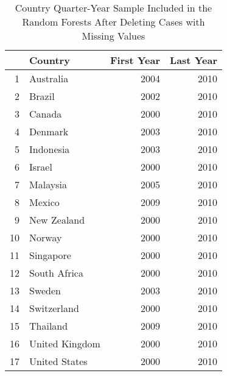\begin{table}[ht]
\centering
\caption{Country Quarter-Year Sample Included in the Random Forests After Deleting Cases with Missing Values} 
\begingroup\tiny
\begin{tabular}{rlrr}
  \hline
 & Country & First Year & Last Year \\ 
  \hline
1 & Australia & 2004 & 2010 \\ 
  2 & Brazil & 2002 & 2010 \\ 
  3 & Canada & 2000 & 2010 \\ 
  4 & Denmark & 2003 & 2010 \\ 
  5 & Indonesia & 2003 & 2010 \\ 
  6 & Israel & 2000 & 2010 \\ 
  7 & Malaysia & 2005 & 2010 \\ 
  8 & Mexico & 2009 & 2010 \\ 
  9 & New Zealand & 2000 & 2010 \\ 
  10 & Norway & 2000 & 2010 \\ 
  11 & Singapore & 2000 & 2010 \\ 
  12 & South Africa & 2000 & 2010 \\ 
  13 & Sweden & 2003 & 2010 \\ 
  14 & Switzerland & 2000 & 2010 \\ 
  15 & Thailand & 2009 & 2010 \\ 
  16 & United Kingdom & 2000 & 2010 \\ 
  17 & United States & 2000 & 2010 \\ 
   \hline
\end{tabular}
\endgroup
\end{table}
